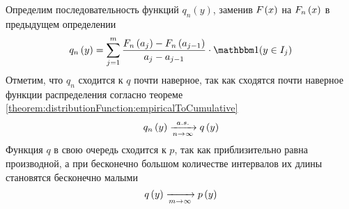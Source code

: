 Определим последовательность функций $q_n\left(y\right)$,
заменив $F_{}\left(x\right)$ на $F_n\left(x\right)$ в предыдущем определении
\begin{equation}\label{eq:histogram_start}
q_n\left(y\right)
= \sum_{j=1}^m \frac{\cdfn{a_j}-\cdfn{a_{j-1}}}{a_j-a_{j-1}}
  \cdot \indicator{y\in I_j}
\end{equation}
Отметим, что $q_n$ сходится к $q$ почти наверное, так как сходятся почти
наверное функции распределения согласно теореме
\ref{theorem:distributionFunction:empiricalToCumulative}
$$q_n\left(y\right)\xrightarrow[n\to\infty]{a.s.} q\left(y\right)$$
Функция $q$ в свою очередь сходится к $p$, так как приблизительно равна
производной, а при бесконечно большом количестве интервалов их длины
становятся бесконечно малыми
$$q\left(y\right)\xrightarrow[m\to\infty]{}p\left(y\right)$$
\begin{comment}
Функция $q_n$ называется гистограммой.
\index{гистограмма}
Избавимся от $a_j$ в формуле, а для этого вспомним, чему равно $\cdfn{x}$
$$\cdfn{x}= \frac{1}{n}\cdot \sum_{k=1}^n
\indicator{x_k\le x}$$

Теперь посмотрим, чему равна разность $\cdfn{a_j}-\cdfn{a_{j-1}}$,
которая, как мы видим, является вероятностью того,
что $x$ попало в отрезок $I_j$
\begin{align*}
  \cdfn{a_j}-\cdfn{a_{j-1}}= \\
  = \frac{1}{n}\cdot \sum_{k=1}^n
    \indicator{x_k\le a_j}-\frac{1}{n}\cdot \sum_{k=1}^n
    \indicator{x_k\le a_{j-1}}
\end{align*}

Сгруппируем слагаемые и получим чуть более компактную запись разности
\begin{eqnarray}\label{eq:cdfn_difference}
  \cdfn{a_j}-\cdfn{a_{j-1}}= \nonumber\\
  = \frac{1}{n}\cdot \sum_{k=1}^n
    \left[\indicator{x_k\le a_j}-\indicator{x_k\le a_{j-1}}\right]
\end{eqnarray}

Рассмотрим возможные значения индикаторов

Если оба индикатора равны единице,
это значит, что $x_k$ не больше $a_j$ и не больше $a_{j-1}$.
Поскольку $a_{j-1}\le a_j$, то можно обойтись тем, что $x\le a_{j-1}$
\begin{align*}
  \begin{cases}
    \indicator{x_k\le a_j}=1\\
    \indicator{x_k\le a_{j-1}}=1\\
    a_{j-1} < a_j
  \end{cases}
  \Rightarrow
  \begin{cases}
    x_k\le a_j\\
    x_k\le a_{j-1}\\
    a_{j-1} < a_j
  \end{cases}
  \\\Rightarrow
    x_k\le a_{j-1} < a_j
  \Rightarrow
    x_k\le a_{j-1}
\end{align*}


\end{comment}
